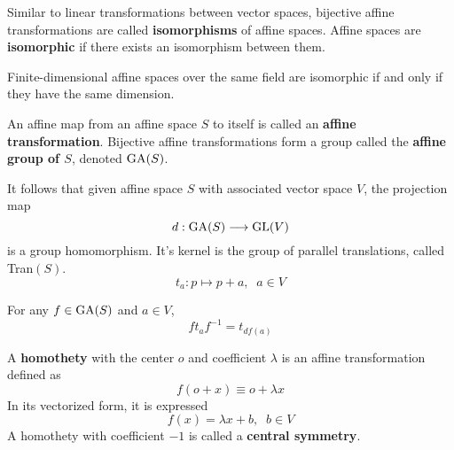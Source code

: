   \begin{definition}
    Similar to linear transformations between vector spaces, bijective affine transformations are called \textbf{isomorphisms} of affine spaces. Affine spaces are \textbf{isomorphic} if there exists an isomorphism between them. 
  \end{definition}

  \begin{corollary}
    Finite-dimensional affine spaces over the same field are isomorphic if and only if they have the same dimension. 
  \end{corollary}

  \begin{definition}
    An affine map from an affine space $S$ to itself is called an \textbf{affine transformation}. Bijective affine transformations form a group called the \textbf{affine group of $S$}, denoted $\operatorname{GA}(S)$. 
  \end{definition}

  It follows that given affine space $S$ with associated vector space $V$, the projection map
  \begin{equation}
    d: \operatorname{GA}(S) \longrightarrow \operatorname{GL}(V)
  \end{equation}
  is a group homomorphism. It's kernel is the group of parallel translations, called Tran$(S)$. 
  \begin{equation}
    t_a : p \mapsto p + a, \;\; a \in V
  \end{equation}

  \begin{proposition}
    For any $f \in \operatorname{GA}(S)$ and $a \in V$, 
    \begin{equation}
      f t_a f^{-1} = t_{df(a)}
    \end{equation}
  \end{proposition}

  \begin{definition}
    A \textbf{homothety} with the center $o$ and coefficient $\lambda$ is an affine transformation defined as
    \begin{equation}
      f( o + x ) \equiv o + \lambda x
    \end{equation}
    In its vectorized form, it is expressed
    \begin{equation}
      f(x) = \lambda x + b, \;\; b \in V
    \end{equation}
    A homothety with coefficient $-1$ is called a \textbf{central symmetry}. 
  \end{definition}

